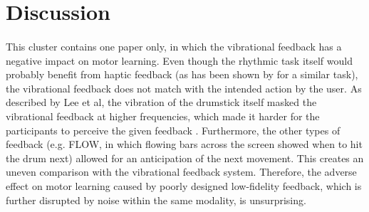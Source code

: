 
\section{Discussion}




\paragraph{}
This cluster contains one paper only, in which the vibrational feedback has a negative impact on motor learning. Even though the rhythmic task itself would probably benefit from haptic feedback (as has been shown by \cite{Graham2008} for a similar task), the vibrational feedback does not match with the intended action by the user. As described by Lee et al, the vibration of the drumstick itself masked the vibrational feedback at higher frequencies, which made it harder for the participants to perceive the given feedback \cite{Lee2012}. Furthermore, the other types of feedback (e.g. FLOW, in which flowing bars across the screen showed when to hit the drum next) allowed for an anticipation of the next movement. This creates an uneven comparison with the vibrational feedback system. Therefore, the adverse effect on motor learning caused by poorly designed low-fidelity feedback, which is further disrupted by noise within the same modality, is unsurprising.

